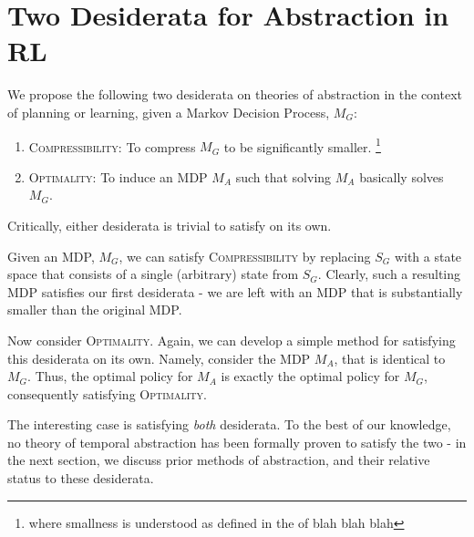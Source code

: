 \section{Two Desiderata for Abstraction in RL}

We propose the following two desiderata on theories of abstraction in the context of planning or learning, given a Markov Decision Process, $M_G$:
\begin{enumerate}
\item \textsc{Compressibility}: To compress $M_G$ to be significantly smaller. \footnote{where smallness is understood as defined in the of \cite{LITTMAN COMPLEXITY}  blah blah blah}
\item \textsc{Optimality}: To induce an MDP $M_A$ such that solving $M_A$ basically solves $M_G$.
\end{enumerate}


Critically, either desiderata is trivial to satisfy on its own.

Given an \ac{MDP}, $M_G$, we can satisfy \textsc{Compressibility} by replacing $S_G$ with a state space that consists of a single (arbitrary) state from $S_G$. Clearly, such a resulting \ac{MDP} satisfies our first desiderata - we are left with an MDP that is substantially smaller than the original MDP. 

Now consider \textsc{Optimality}. Again, we can develop a simple method for satisfying this desiderata on its own. Namely, consider the MDP $M_A$, that is identical to $M_G$. Thus, the optimal policy for $M_A$ is exactly the optimal policy for $M_G$, consequently satisfying \textsc{Optimality}.

The interesting case is satisfying {\it both} desiderata. To the best of our knowledge, no theory of temporal abstraction has been formally proven to satisfy the two - in the next section, we discuss prior methods of abstraction, and their relative status to these desiderata.
